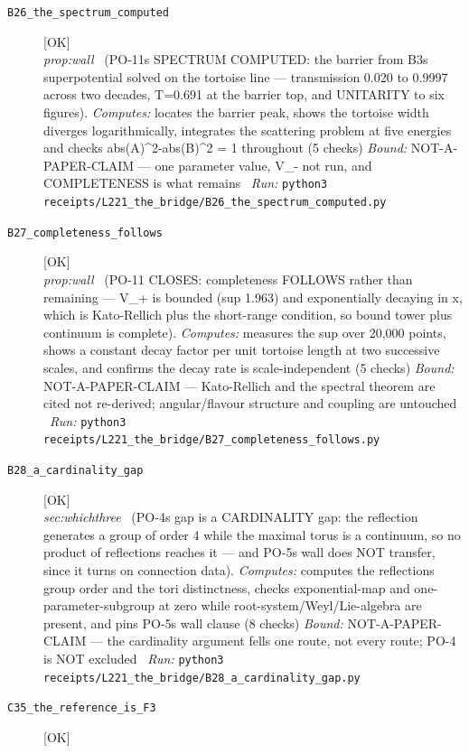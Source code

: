 \begin{description}
\item[\label{rcpt:B26_the_spectrum_computed}\texttt{B26\_the\_spectrum\_computed}]\hfill\textsf{[OK]}\\
\textit{prop:wall} \ (PO-11s SPECTRUM COMPUTED: the barrier from B3s superpotential solved on the tortoise line --- transmission 0.020 to 0.9997 across two decades, T=0.691 at the barrier top, and UNITARITY to six figures). 
\emph{Computes:} locates the barrier peak, shows the tortoise width diverges logarithmically, integrates the scattering problem at five energies and checks abs(A)\textasciicircum{}2-abs(B)\textasciicircum{}2 = 1 throughout (5 checks)
 \emph{Bound:} NOT-A-PAPER-CLAIM --- one parameter value, V\_- not run, and COMPLETENESS is what remains
\ \emph{Run:} \texttt{python3 receipts/L221\_the\_bridge/B26\_the\_spectrum\_computed.py}
\item[\label{rcpt:B27_completeness_follows}\texttt{B27\_completeness\_follows}]\hfill\textsf{[OK]}\\
\textit{prop:wall} \ (PO-11 CLOSES: completeness FOLLOWS rather than remaining --- V\_+ is bounded (sup 1.963) and exponentially decaying in x, which is Kato-Rellich plus the short-range condition, so bound tower plus continuum is complete). 
\emph{Computes:} measures the sup over 20,000 points, shows a constant decay factor per unit tortoise length at two successive scales, and confirms the decay rate is scale-independent (5 checks)
 \emph{Bound:} NOT-A-PAPER-CLAIM --- Kato-Rellich and the spectral theorem are cited not re-derived; angular/flavour structure and coupling are untouched
\ \emph{Run:} \texttt{python3 receipts/L221\_the\_bridge/B27\_completeness\_follows.py}
\item[\label{rcpt:B28_a_cardinality_gap}\texttt{B28\_a\_cardinality\_gap}]\hfill\textsf{[OK]}\\
\textit{sec:whichthree} \ (PO-4s gap is a CARDINALITY gap: the reflection generates a group of order 4 while the maximal torus is a continuum, so no product of reflections reaches it --- and PO-5s wall does NOT transfer, since it turns on connection data). 
\emph{Computes:} computes the reflections group order and the tori distinctness, checks exponential-map and one-parameter-subgroup at zero while root-system/Weyl/Lie-algebra are present, and pins PO-5s wall clause (8 checks)
 \emph{Bound:} NOT-A-PAPER-CLAIM --- the cardinality argument fells one route, not every route; PO-4 is NOT excluded
\ \emph{Run:} \texttt{python3 receipts/L221\_the\_bridge/B28\_a\_cardinality\_gap.py}
\item[\label{rcpt:C35_the_reference_is_F3}\texttt{C35\_the\_reference\_is\_F3}]\hfill\textsf{[OK]}\\

\end{description}
